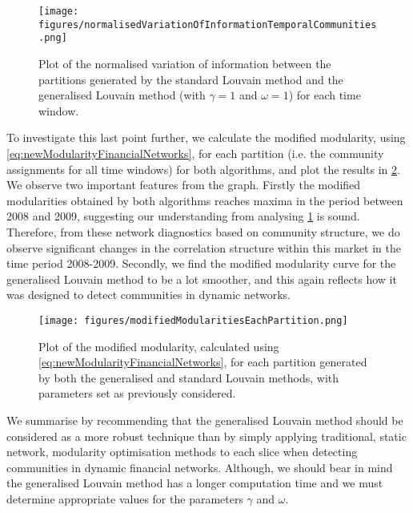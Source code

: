 \begin{figure}
	\centering
	\texttt{[image: figures/normalisedVariationOfInformationTemporalCommunities.png]}
	\caption[Plot of the normalised variation of information between the partitions generated by the standard and generalised Louvain methods for each time window.]{\label{fig:normalisedVariationOfInformationTemporalCommunities} Plot of the normalised variation of information between the partitions generated by the standard Louvain method and the generalised Louvain method (with $\gamma = 1$ and $\omega=1$) for each time window.}
\end{figure}

To investigate this last point further, we calculate the modified modularity, using \cref{eq:newModularityFinancialNetworks}, for each partition (i.e. the community assignments for all time windows) for both algorithms, and plot the results in \cref{fig:modifiedModularitiesEachPartition}.
We observe two important features from the graph.
Firstly the modified modularities obtained by both algorithms reaches maxima in the period between 2008 and 2009, suggesting our understanding from analysing \cref{fig:normalisedVariationOfInformationTemporalCommunities} is sound.
Therefore, from these network diagnostics based on community structure, we do observe significant changes in the correlation structure within this market in the time period 2008-2009.
Secondly, we find the modified modularity curve for the generalised Louvain method to be a lot smoother, and this again reflects how it was designed to detect communities in dynamic networks.

\begin{figure}
	\centering
	\texttt{[image: figures/modifiedModularitiesEachPartition.png]}
	\caption[Plot of the modified modularity for each partition generated by both the generalised and standard Louvain methods.]{\label{fig:modifiedModularitiesEachPartition} Plot of the modified modularity, calculated using \cref{eq:newModularityFinancialNetworks}, for each partition generated by both the generalised and standard Louvain methods, with parameters set as previously considered.}
\end{figure}

We summarise by recommending that the generalised Louvain method should be considered as a more robust technique than by simply applying traditional, static network, modularity optimisation methods to each slice when detecting communities in dynamic financial networks.
Although, we should bear in mind the generalised Louvain method has a longer computation time and we must determine appropriate values for the parameters $\gamma$ and $\omega$.